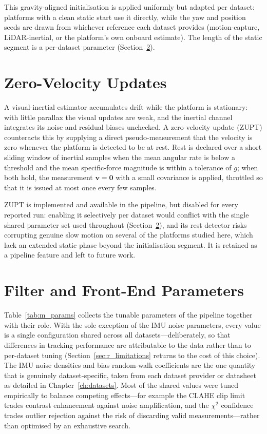 This gravity-aligned initialisation is applied uniformly but adapted per dataset: platforms with a clean static start use it directly, while the yaw and position seeds are drawn from whichever reference each dataset provides (motion-capture, LiDAR-inertial, or the platform's own onboard estimate). The length of the static segment is a per-dataset parameter (Section~\ref{sec:m_params}).

\section{Zero-Velocity Updates}
\label{sec:m_zupt}
A visual-inertial estimator accumulates drift while the platform is stationary: with little parallax the visual updates are weak, and the inertial channel integrates its noise and residual biases unchecked. A zero-velocity update (ZUPT) counteracts this by supplying a direct pseudo-measurement that the velocity is zero whenever the platform is detected to be at rest. Rest is declared over a short sliding window of inertial samples when the mean angular rate is below a threshold and the mean specific-force magnitude is within a tolerance of $g$; when both hold, the measurement $\mathbf{v} = \mathbf{0}$ with a small covariance is applied, throttled so that it is issued at most once every few samples.

ZUPT is implemented and available in the pipeline, but disabled for every reported run: enabling it selectively per dataset would conflict with the single shared parameter set used throughout (Section~\ref{sec:m_params}), and its rest detector risks corrupting genuine slow motion on several of the platforms studied here, which lack an extended static phase beyond the initialisation segment. It is retained as a pipeline feature and left to future work.

\section{Filter and Front-End Parameters}
\label{sec:m_params}
Table~\ref{tab:m_params} collects the tunable parameters of the pipeline together with their role. With the sole exception of the IMU noise parameters, every value is a single configuration shared across all datasets---deliberately, so that differences in tracking performance are attributable to the data rather than to per-dataset tuning (Section~\ref{sec:r_limitations} returns to the cost of this choice). The IMU noise densities and bias random-walk coefficients are the one quantity that is genuinely dataset-specific, taken from each dataset provider or datasheet as detailed in Chapter~\ref{ch:datasets}. Most of the shared values were tuned empirically to balance competing effects---for example the CLAHE clip limit trades contrast enhancement against noise amplification, and the $\chi^2$ confidence trades outlier rejection against the risk of discarding valid measurements---rather than optimised by an exhaustive search.


